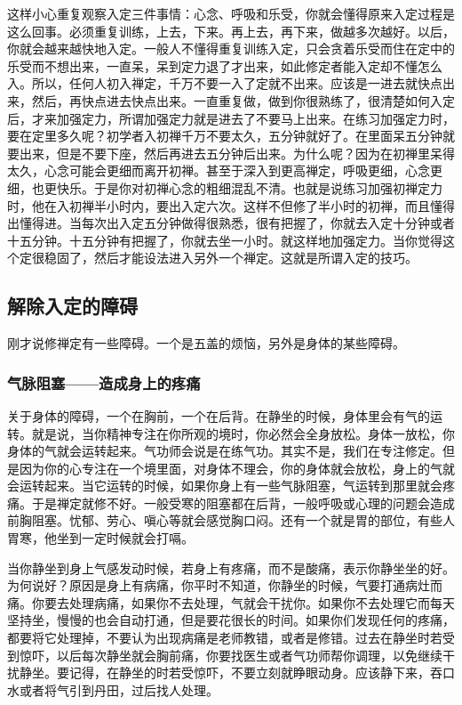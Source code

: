 \documentclass{book}
\begin{document}
这样小心重复观察入定三件事情：心念、呼吸和乐受，你就会懂得原来入定过程是这么回事。必须重复训练，上去，下来。再上去，再下来，做越多次越好。以后，你就会越来越快地入定。一般人不懂得重复训练入定，只会贪着乐受而住在定中的乐受而不想出来，一直呆，呆到定力退了才出来，如此修定者能入定却不懂怎么入。所以，任何人初入禅定，千万不要一入了定就不出来。应该是一进去就快点出来，然后，再快点进去快点出来。一直重复做，做到你很熟练了，很清楚如何入定后，才来加强定力，所谓加强定力就是进去了不要马上出来。在练习加强定力时，要在定里多久呢？初学者入初禅千万不要太久，五分钟就好了。在里面呆五分钟就要出来，但是不要下座，然后再进去五分钟后出来。为什么呢？因为在初禅里呆得太久，心念可能会更细而离开初禅。甚至于深入到更高禅定，呼吸更细，心念更细，也更快乐。于是你对初禅心念的粗细混乱不清。也就是说练习加强初禅定力时，他在入初禅半小时内，要出入定六次。这样不但修了半小时的初禅，而且懂得出懂得进。当每次出入定五分钟做得很熟悉，很有把握了，你就去入定十分钟或者十五分钟。十五分钟有把握了，你就去坐一小时。就这样地加强定力。当你觉得这个定很稳固了，然后才能设法进入另外一个禅定。这就是所谓入定的技巧。

\subsection{解除入定的障碍}

刚才说修禅定有一些障碍。一个是五盖的烦恼，另外是身体的某些障碍。

\subsubsection{气脉阻塞——造成身上的疼痛}

关于身体的障碍，一个在胸前，一个在后背。在静坐的时候，身体里会有气的运转。就是说，当你精神专注在你所观的境时，你必然会全身放松。身体一放松，你身体的气就会运转起来。气功师会说是在练气功。其实不是，我们在专注修定。但是因为你的心专注在一个境里面，对身体不理会，你的身体就会放松，身上的气就会运转起来。当它运转的时候，如果你身上有一些气脉阻塞，气运转到那里就会疼痛。于是禅定就修不好。一般受寒的阻塞都在后背，一般呼吸或心理的问题会造成前胸阻塞。忧郁、劳心、嗔心等就会感觉胸口闷。还有一个就是胃的部位，有些人胃寒，他坐到一定时候就会打嗝。

当你静坐到身上气感发动时候，若身上有疼痛，而不是酸痛，表示你静坐坐的好。为何说好？原因是身上有病痛，你平时不知道，你静坐的时候，气要打通病灶而痛。你要去处理病痛，如果你不去处理，气就会干扰你。如果你不去处理它而每天坚持坐，慢慢的也会自动打通，但是要花很长的时间。如果你们发现任何的疼痛，都要将它处理掉，不要认为出现病痛是老师教错，或者是修错。过去在静坐时若受到惊吓，以后每次静坐就会胸前痛，你要找医生或者气功师帮你调理，以免继续干扰静坐。要记得，在静坐的时若受惊吓，不要立刻就睁眼动身。应该静下来，吞口水或者将气引到丹田，过后找人处理。
\end{document}
